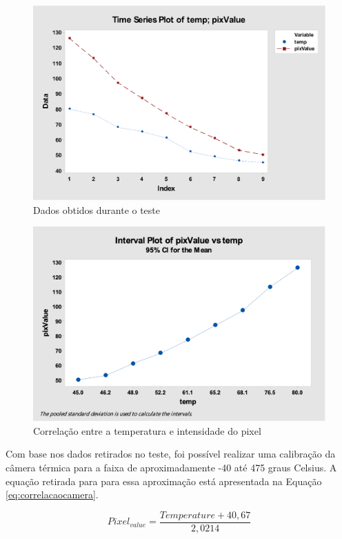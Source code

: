 		\begin{figure}[!ht]
		   \centering
		   \includegraphics[width=12cm]{Figures/ircamera_data.png}
		   \caption{Dados obtidos durante o teste}
		   \label{fig:ircameradata}
		\end{figure}
		 
		\begin{figure}[!ht]
		   \centering
		   \includegraphics[width=12cm]{Figures/ircamera_test.png}
		   \caption{Correlação entre a temperatura e intensidade do pixel}
		   \label{fig:IRcameraGraph}
		\end{figure}
		 
		Com base nos dados retirados no teste, foi possível realizar uma calibração da câmera térmica para a faixa de aproximadamente -40 até 475 graus Celsius. A equação retirada para para essa aproximação está apresentada na Equação \ref{eq:correlacaocamera}.
		
		\begin{equation}
			Pixel_{value} = \frac{Temperature + 40,67}{2,0214}
			\label{eq:correlacaocamera}
		\end{equation}
		 

